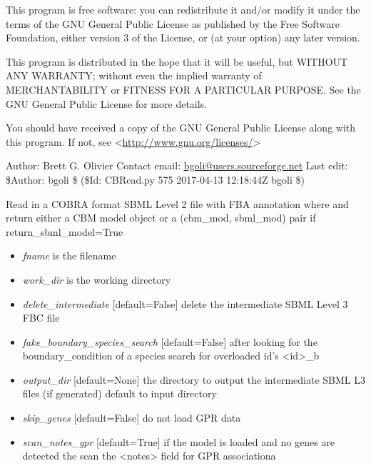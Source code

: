 \documentclass[a4paper,11pt,english]{sphinxmanual}
\begin{document}
This program is free software: you can redistribute it and/or modify
it under the terms of the GNU General Public License as published by
the Free Software Foundation, either version 3 of the License, or
(at your option) any later version.

This program is distributed in the hope that it will be useful,
but WITHOUT ANY WARRANTY; without even the implied warranty of
MERCHANTABILITY or FITNESS FOR A PARTICULAR PURPOSE.  See the
GNU General Public License for more details.

You should have received a copy of the GNU General Public License
along with this program.  If not, see \textless{}\url{http://www.gnu.org/licenses/}\textgreater{}

Author: Brett G. Olivier
Contact email: \href{mailto:bgoli@users.sourceforge.net}{bgoli@users.sourceforge.net}
Last edit: \$Author: bgoli \$ (\$Id: CBRead.py 575 2017-04-13 12:18:44Z bgoli \$)

\begin{fulllineitems}
\label{modules_doc:cbmpy.CBRead.readCOBRASBML}
Read in a COBRA format SBML Level 2 file with FBA annotation where and return either a CBM model object
or a (cbm\_mod, sbml\_mod) pair if return\_sbml\_model=True
\begin{itemize}
\item {} 
\emph{fname} is the filename

\item {} 
\emph{work\_dir} is the working directory

\item {} 
\emph{delete\_intermediate} {[}default=False{]} delete the intermediate SBML Level 3 FBC file

\item {} 
\emph{fake\_boundary\_species\_search} {[}default=False{]} after looking for the boundary\_condition of a species search for overloaded id's \textless{}id\textgreater{}\_b

\item {} 
\emph{output\_dir} {[}default=None{]} the directory to output the intermediate SBML L3 files (if generated) default to input directory

\item {} 
\emph{skip\_genes} {[}default=False{]} do not load GPR data

\item {} 
\emph{scan\_notes\_gpr} {[}default=True{]} if the model is loaded and no genes are detected the scan the \textless{}notes\textgreater{} field for GPR associationa

\end{itemize}

\end{fulllineitems}
\end{document}
